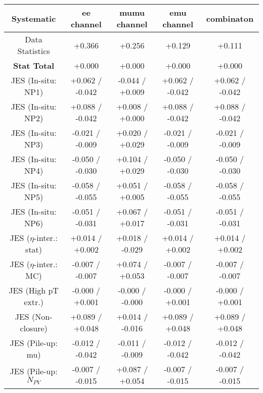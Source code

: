 \begin{table}[htbp]
\scriptsize
  \begin{center} 
  \begin{tabular}{|c|c|c|c|c|}
  \hline
Systematic                            &  ee channel&  mumu channel&  emu channel&  combinaton\\
  \hline
Data Statistics                       &+0.366              & +0.256              & +0.129              & +0.111             \\
\hline
\textbf{Stat Total}                   &+0.000              & +0.000              & +0.000              & +0.000             \\
\hline
JES (In-situ: NP1)                    &+0.062   / -0.042   & -0.044   / +0.009   & +0.062   / -0.042   & +0.062   / -0.042  \\
JES (In-situ: NP2)                    &+0.088   / -0.042   & +0.008   / +0.000   & +0.088   / -0.042   & +0.088   / -0.042  \\
JES (In-situ: NP3)                    &-0.021   / -0.009   & +0.020   / +0.029   & -0.021   / -0.009   & -0.021   / -0.009  \\
JES (In-situ: NP4)                    &-0.050   / -0.030   & +0.104   / +0.029   & -0.050   / -0.030   & -0.050   / -0.030  \\
JES (In-situ: NP5)                    &-0.058   / -0.055   & +0.051   / +0.005   & -0.058   / -0.055   & -0.058   / -0.055  \\
JES (In-situ: NP6)                    &-0.051   / -0.031   & +0.067   / +0.017   & -0.051   / -0.031   & -0.051   / -0.031  \\
JES ($\eta$-inter.: stat)               &+0.014   / +0.002   & +0.018   / -0.029   & +0.014   / +0.002   & +0.014   / +0.002  \\
JES ($\eta$-inter.: MC)                 &-0.007   / -0.007   & +0.074   / +0.053   & -0.007   / -0.007   & -0.007   / -0.007  \\
JES (High pT extr.)                  &-0.000   / +0.001   & -0.000   / -0.000   & -0.000   / +0.001   & -0.000   / +0.001  \\
JES (Non-closure)                     &+0.089   / +0.048   & +0.014   / -0.016   & +0.089   / +0.048   & +0.089   / +0.048  \\
JES (Pile-up: mu)                     &-0.012   / -0.042   & -0.011   / -0.009   & -0.012   / -0.042   & -0.012   / -0.042  \\
JES (Pile-up: $N_{PV}$                  &-0.007   / -0.015   & +0.087   / +0.054   & -0.007   / -0.015   & -0.007   / -0.015  \\

\end{tabular}
\end{center}
\end{table}
